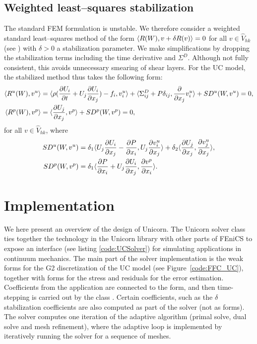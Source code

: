\subsection{Weighted least--squares stabilization}

The standard FEM formulation is unstable.  We therefore consider a
weighted standard least--squares method of the form
$\langle R(W), v + \delta R(v) \rangle = 0$ for all $v \in \hat{V}_{hk}$ (see
\citet{ErikssonEstepHansboEtAl1996,HoffmanJohnson2007}) with $\delta > 0$ a stabilization
parameter. We make simplifications by dropping the stabilization terms
including the time derivative and $\Sigma^D$. Although not fully
consistent, this avoids unnecessary smearing of shear layers. For the
UC model, the stabilized method thus takes the following form:
\begin{align}
  \langle R^u(W), v^u \rangle &=
  \langle \rho(\frac{\partial U_i}{\partial t} + U_j \frac{\partial U_i}{\partial x_j} ) - f_i, v^u_i \rangle +
  \langle \Sigma^D_{ij} + P \delta_{ij}, \frac{\partial}{\partial x_j} v^u_i \rangle + SD^u(W, v^u) = 0, \\
  \langle R^p(W), v^p \rangle &= \langle \frac{\partial U_j}{\partial x_j}, v^p \rangle + SD^p(W, v^p) = 0,
\end{align}
for all $v \in \hat{V}_{hk}$, where
\begin{align}
  SD^u(W, v^u) &=
  \delta_1 \langle U_j \frac{\partial U_i}{\partial x_j} - \frac{\partial P}{\partial x_i}, U_j \frac{\partial v^u_i}{\partial x_j}  \rangle +
  \delta_2 \langle \frac{\partial U_j}{\partial x_j}, \frac{\partial v^u_j}{\partial x_j}  \rangle, \\
  SD^p(W, v^p) &= \delta_1 \langle \frac{\partial P}{\partial x_i} + U_j \frac{\partial U_i}{\partial x_j}, \frac{\partial v^p}{\partial x_i} \rangle.
\end{align}

\section{Implementation}

We here present an overview of the design of Unicorn. The Unicorn
solver class  ties together the technology in the
Unicorn library with other parts of FEniCS to expose an interface (see
listing \ref{code:UCSolver}) for simulating applications in continuum
mechanics. The main part of the solver implementation is the weak
forms for the G2 discretization of the UC model (see
Figure~\ref{code:FFC_UC}), together with forms for the stress and
residuals for the error estimation. Coefficients from the application
are connected to the form, and then time-stepping is carried out by
the class . Certain coefficients, such as the
$\delta$ stabilization coefficients are also computed as part of the
solver (not as forms). The solver computes one iteration of the
adaptive algorithm (primal solve, dual solve and mesh refinement),
where the adaptive loop is implemented by iteratively running the
solver for a sequence of meshes.

